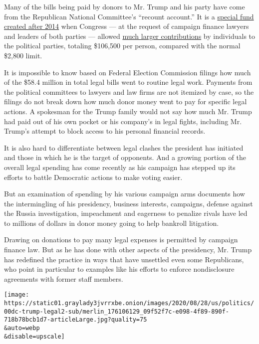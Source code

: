 Many of the bills being paid by donors to Mr. Trump and his party have
come from the Republican National Committee's ``recount account.'' It is
a
\href{https://www.fec.gov/help-candidates-and-committees/registering-political-party/national-party-accounts-certain-expenses/}{special
fund created after 2014} when Congress --- at the request of campaign
finance lawyers and leaders of both parties --- allowed
\href{https://www.fec.gov/resources/cms-content/documents/contribution_limits_chart_2019-2020.pdf}{much
larger contributions} by individuals to the political parties, totaling
\$106,500 per person, compared with the normal \$2,800 limit.

It is impossible to know based on Federal Election Commission filings
how much of the \$58.4 million in total legal bills went to routine
legal work. Payments from the political committees to lawyers and law
firms are not itemized by case, so the filings do not break down how
much donor money went to pay for specific legal actions. A spokesman for
the Trump family would not say how much Mr. Trump had paid out of his
own pocket or his company's in legal fights, including Mr. Trump's
attempt to block access to his personal financial records.

It is also hard to differentiate between legal clashes the president has
initiated and those in which he is the target of opponents. And a
growing portion of the overall legal spending has come recently as his
campaign has stepped up its efforts to battle Democratic actions to make
voting easier.

But an examination of spending by his various campaign arms documents
how the intermingling of his presidency, business interests, campaigns,
defense against the Russia investigation, impeachment and eagerness to
penalize rivals have led to millions of dollars in donor money going to
help bankroll litigation.

Drawing on donations to pay many legal expenses is permitted by campaign
finance law. But as he has done with other aspects of the presidency,
Mr. Trump has redefined the practice in ways that have unsettled even
some Republicans, who point in particular to examples like his efforts
to enforce nondisclosure agreements with former staff members.

\texttt{[image: https://static01.graylady3jvrrxbe.onion/images/2020/08/28/us/politics/00dc-trump-legal2-sub/merlin\_176106129\_09f52f7c-e098-4f89-890f-718b78bcb1d7-articleLarge.jpg?quality=75\\\&auto=webp\\\&disable=upscale]}

